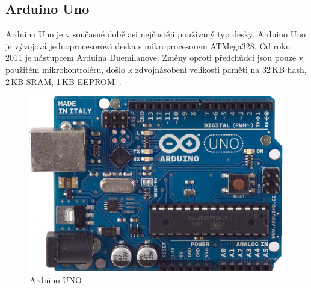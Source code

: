 		\subsection{Arduino Uno} Arduino Uno je v současné době asi nejčastěji používaný typ desky. Arduino Uno je vývojová jednoprocesorová deska s mikroprocesorem ATMega328. Od roku 2011 je nástupcem Arduina Duemilanove. Změny oproti předchůdci jsou pouze v použitém mikrokontroléru, došlo k zdvojnásobení velikosti paměti na 32\,KB flash, 2\,KB SRAM, 1\,KB EEPROM~\cite{ArduinoUno}.
		\begin{figure}[!h]
  \begin{center}
    \includegraphics[scale=0.25]{obrazky/emded_arduino_uno}
  \end{center}
  \caption{Arduino UNO~\cite{ArduinoUno}}
\end{figure}
	
